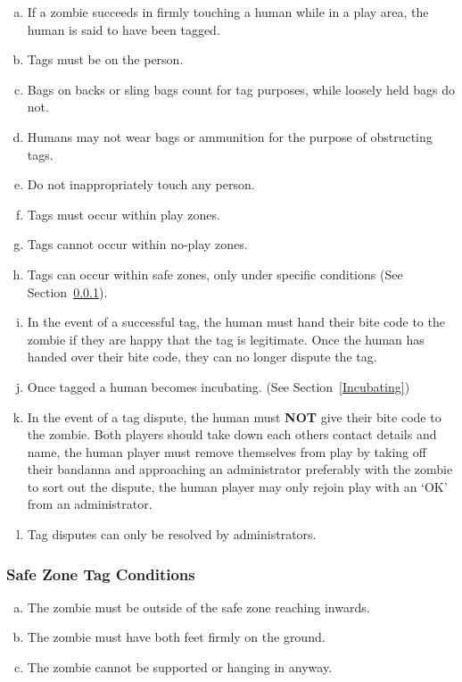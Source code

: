 \documentclass[a4paper,12pt]{article}
\begin{document}
\begin{enumerate}[(a)]
    \item If a zombie succeeds in firmly touching a human while in a  play area, the human is said to have been tagged.
    \item Tags must be on the person.
    \item Bags on backs or sling bags count for tag purposes, while loosely held bags do not.
    \item Humans may not wear bags or ammunition for the purpose of obstructing tags.
    \item Do not inappropriately touch any person.
    \item Tags must occur within play zones.
    \item Tags cannot occur within no-play zones.
    \item Tags can occur within safe zones, only under specific conditions (See Section~\ref{SafeZoneTag}). 
    \item In the event of a successful tag, the human must hand their bite code to the zombie if they are happy that the tag is legitimate. Once the human has handed over their bite code, they can no longer dispute the tag.    
    \item Once tagged a human becomes incubating. (See Section~\ref{Incubating})
    \item In the event of a tag dispute, the human must {\bf NOT} give their bite code to the zombie. Both players should take down each others contact details and name, the human player must remove themselves from play by taking off their bandanna and approaching an administrator preferably with the zombie to sort out the dispute, the human player may only rejoin play with an `OK' from an administrator.
    \item Tag disputes can only be resolved by administrators.   
\end{enumerate}

\subsubsection{Safe Zone Tag Conditions}
\label{SafeZoneTag}
\begin{enumerate}[(a)]
    \item The zombie must be outside of the safe zone reaching inwards.
    \item The zombie must have both feet firmly on the ground.  
    \item The zombie cannot be supported or hanging in anyway.
\end{enumerate}
\end{document}
